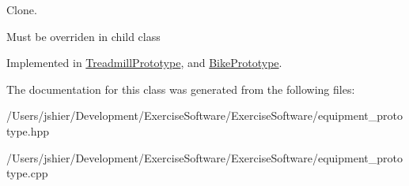 Clone. 

Must be overriden in child class 

Implemented in \hyperlink{class_treadmill_prototype_abd7e7f894721af9f03b248b6617d4fdc}{Treadmill\+Prototype}, and \hyperlink{class_bike_prototype_a10732d6849be44963b62994b724605b1}{Bike\+Prototype}.



The documentation for this class was generated from the following files\+:\begin{DoxyCompactItemize}
\item 
/\+Users/jshier/\+Development/\+Exercise\+Software/\+Exercise\+Software/equipment\+\_\+prototype.\+hpp\item 
/\+Users/jshier/\+Development/\+Exercise\+Software/\+Exercise\+Software/equipment\+\_\+prototype.\+cpp\end{DoxyCompactItemize}

